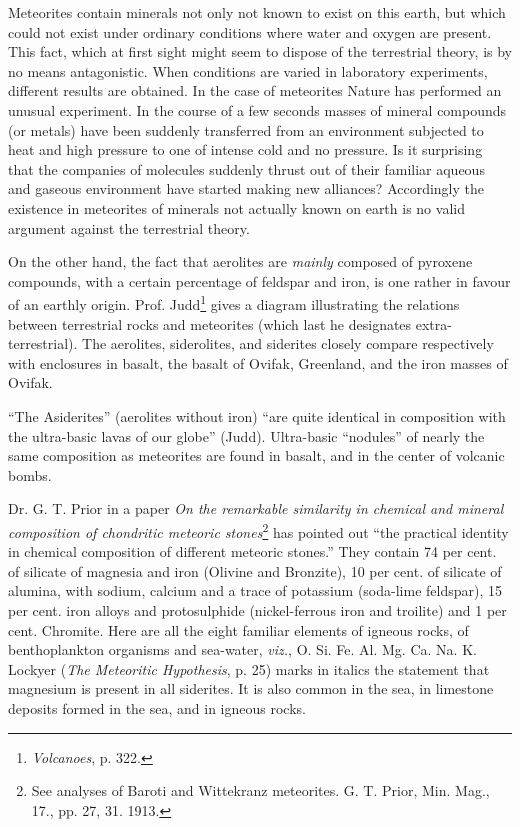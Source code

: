 \documentclass[a4paper, 12pt, oneside]{article}
\begin{document}
Meteorites contain minerals not only not known to exist on this earth, but which could not exist under ordinary conditions where water and oxygen are present. This fact, which at first sight might seem to dispose of the terrestrial theory, is by no means antagonistic. When conditions are varied in laboratory experiments, different results are obtained. In the case of meteorites Nature has performed an unusual experiment. In the course of a few seconds masses of mineral compounds (or metals) have been suddenly transferred from an environment subjected to heat and high pressure to one of intense cold and no pressure. Is it surprising that the companies of molecules suddenly thrust out of their familiar aqueous and gaseous environment have started making new alliances? Accordingly the existence in meteorites of minerals not actually known on earth is no valid argument against the terrestrial theory.

On the other hand, the fact that aerolites are \emph{mainly} composed of pyroxene compounds, with a certain percentage of feldspar and iron, is one rather in favour of an earthly origin. Prof. Judd\footnote{\emph{Volcanoes}, p. 322.} gives a diagram illustrating the relations between terrestrial rocks and meteorites (which last he designates extra-terrestrial). The aerolites, siderolites, and siderites closely compare respectively with enclosures in basalt, the basalt of Ovifak, Greenland, and the iron masses of Ovifak.

``The Asiderites'' (aerolites without iron) ``are quite identical in composition with the ultra-basic lavas of our globe'' (Judd). Ultra-basic ``nodules'' of nearly the same composition as meteorites are found in basalt, and in the center of volcanic bombs.

Dr. G. T. Prior in a paper \emph{On the remarkable similarity in chemical and mineral composition of chondritic meteoric stones}\footnote{See analyses of Baroti and Wittekranz meteorites. G. T. Prior, Min. Mag., 17., pp. 27, 31. 1913.} has pointed out ``the practical identity in chemical composition of different meteoric stones.'' They contain 74 per cent. of silicate of magnesia and iron (Olivine and Bronzite), 10 per cent. of silicate of alumina, with sodium, calcium and a trace of potassium (soda-lime feldspar), 15 per cent. iron alloys and protosulphide (nickel-ferrous iron and troilite) and 1 per cent. Chromite. Here are all the eight familiar elements of igneous rocks, of benthoplankton organisms and sea-water, \emph{viz.}, O. Si. Fe. Al. Mg. Ca. Na. K. Lockyer (\emph{The Meteoritic Hypothesis}, p. 25) marks in italics the statement that magnesium is present in all siderites. It is also common in the sea, in limestone deposits formed in the sea, and in igneous rocks.
\end{document}
